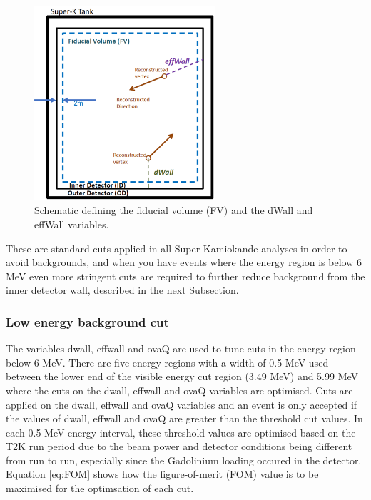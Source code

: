 \begin{figure}
    \centering 
    \includegraphics[width=0.6\textwidth]{Figures/fv_dwall_effwall.png}
    \caption{Schematic defining the fiducial volume (FV) and the dWall and effWall variables.}
    \label{fig:dwall_effwall_fv}
\end{figure} 
                                                                                        
These are standard cuts applied in all Super-Kamiokande analyses in order to avoid backgrounds, and when you have events where the energy region is below 6 MeV even more stringent cuts are required to further reduce background from the inner detector wall, described in the next Subsection. 

\subsubsection{Low energy background cut}

The variables dwall, effwall and ovaQ are used to tune cuts in the energy region below 6 MeV. There are five energy regions with a width of 0.5 MeV used between the lower end of the visible energy cut region (3.49 MeV) and 5.99 MeV where the cuts on the dwall, effwall and ovaQ variables are optimised. Cuts are applied on the dwall, effwall and ovaQ variables and an event is only accepted if the values of dwall, effwall and ovaQ are greater than the threshold cut values. In each 0.5 MeV energy interval, these threshold values are optimised based on the T2K run period due to the beam power and detector conditions being different from run to run, especially since the Gadolinium loading occured in the detector. Equation \ref{eq:FOM} shows how the figure-of-merit (FOM) value is to be maximised for the optimsation of each cut.

